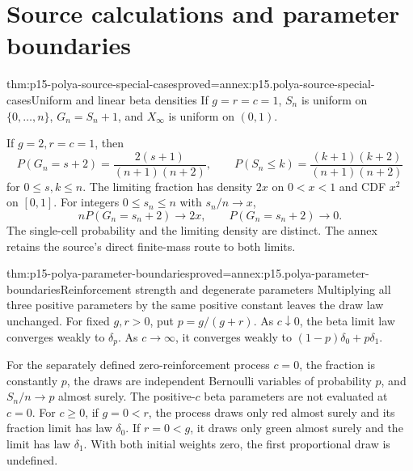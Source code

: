\section{Source calculations and parameter boundaries}

\begin{hbtheorem}{thm:p15-polya-source-special-cases}{proved=annex:p15.polya-source-special-cases}{Uniform and linear beta densities}
If \(g=r=c=1\), \(S_n\) is uniform on \(\{0,\ldots,n\}\),
\(G_n=S_n+1\), and \(X_\infty\) is uniform on \((0,1)\).

If \(g=2,r=c=1\), then
\[
 P(G_n=s+2)=\frac{2(s+1)}{(n+1)(n+2)},\qquad
 P(S_n\leq k)=\frac{(k+1)(k+2)}{(n+1)(n+2)}
\]
for \(0\leq s,k\leq n\). The limiting fraction has density \(2x\)
on \(0<x<1\) and CDF \(x^2\) on \([0,1]\).
For integers \(0\leq s_n\leq n\) with \(s_n/n\to x\),
\[
             nP(G_n=s_n+2)\longrightarrow2x,
             \qquad P(G_n=s_n+2)\longrightarrow0.
\]
The single-cell probability and the limiting density are distinct.
The annex retains the source's direct finite-mass route to both limits.
\end{hbtheorem}

\begin{hbtheorem}{thm:p15-polya-parameter-boundaries}{proved=annex:p15.polya-parameter-boundaries}{Reinforcement strength and degenerate parameters}
Multiplying all three positive parameters by the same positive constant
leaves the draw law unchanged.
For fixed \(g,r>0\), put \(p=g/(g+r)\).
As \(c\downarrow0\), the beta limit law converges weakly to \(\delta_p\).
As \(c\to\infty\), it converges weakly to
\((1-p)\delta_0+p\delta_1\).

For the separately defined zero-reinforcement process \(c=0\),
the fraction is constantly \(p\), the draws are independent Bernoulli
variables of probability \(p\), and \(S_n/n\to p\) almost surely.
The positive-\(c\) beta parameters are not evaluated at \(c=0\).
For \(c\geq0\), if \(g=0<r\), the process draws only red almost
surely and its fraction limit has law \(\delta_0\).
If \(r=0<g\), it draws only green almost surely and the limit
has law \(\delta_1\).
With both initial weights zero, the first proportional draw is undefined.
\end{hbtheorem}


